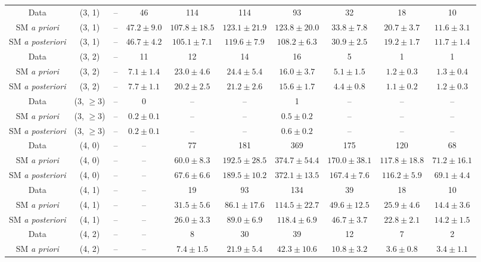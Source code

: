 \begin{table}[h!]
{\begin{tabular}{cccccccccc}
	Data & (3, 1) & -- & 46 & 114 & 114 & 93 & 32 & 18 & 10 \\[0.5ex] 
	SM \textit{a priori} & (3, 1) & -- & $47.2\pm 9.0$ & $107.8\pm 18.5$ & $123.1\pm 21.9$ & $123.8\pm 20.0$ & $33.8\pm 7.8$ & $20.7\pm 3.7$ & $11.6\pm 3.1$ \\[0.5ex] 
	SM \textit{a posteriori} & (3, 1) & -- & $46.7\pm 4.2$ & $105.1\pm 7.1$ & $119.6\pm 7.9$ & $108.2\pm 6.3$ & $30.9\pm 2.5$ & $19.2\pm 1.7$ & $11.7\pm 1.4$ \\[0.5ex] 
	Data & (3, 2) & -- & 11 & 12 & 14 & 16 & 5 & 1 & 1 \\[0.5ex] 
	SM \textit{a priori} & (3, 2) & -- & $7.1\pm 1.4$ & $23.0\pm 4.6$ & $24.4\pm 5.4$ & $16.0\pm 3.7$ & $5.1\pm 1.5$ & $1.2\pm 0.3$ & $1.3\pm 0.4$ \\[0.5ex] 
	SM \textit{a posteriori} & (3, 2) & -- & $7.7\pm 1.1$ & $20.2\pm 2.5$ & $21.2\pm 2.6$ & $15.6\pm 1.7$ & $4.4\pm 0.8$ & $1.1\pm 0.2$ & $1.2\pm 0.3$ \\[0.5ex] 
	Data & (3, $\ge3$) & -- & 0 & -- & -- & 1 & -- & -- & -- \\[0.5ex] 
	SM \textit{a priori} & (3, $\ge3$) & -- & $0.2\pm 0.1$ & -- & -- & $0.5\pm 0.2$ & -- & -- & -- \\[0.5ex] 
	SM \textit{a posteriori} & (3, $\ge3$) & -- & $0.2\pm 0.1$ & -- & -- & $0.6\pm 0.2$ & -- & -- & -- \\[0.5ex] 
	Data & (4, 0) & -- & -- & 77 & 181 & 369 & 175 & 120 & 68 \\[0.5ex] 
	SM \textit{a priori} & (4, 0) & -- & -- & $60.0\pm 8.3$ & $192.5\pm 28.5$ & $374.7\pm 54.4$ & $170.0\pm 38.1$ & $117.8\pm 18.8$ & $71.2\pm 16.1$ \\[0.5ex] 
	SM \textit{a posteriori} & (4, 0) & -- & -- & $67.6\pm 6.6$ & $189.5\pm 10.2$ & $372.1\pm 13.5$ & $167.4\pm 7.6$ & $116.2\pm 5.9$ & $69.1\pm 4.4$ \\[0.5ex] 
	Data & (4, 1) & -- & -- & 19 & 93 & 134 & 39 & 18 & 10 \\[0.5ex] 
	SM \textit{a priori} & (4, 1) & -- & -- & $31.5\pm 5.6$ & $86.1\pm 17.6$ & $114.5\pm 22.7$ & $49.6\pm 12.5$ & $25.9\pm 4.6$ & $14.4\pm 3.6$ \\[0.5ex] 
	SM \textit{a posteriori} & (4, 1) & -- & -- & $26.0\pm 3.3$ & $89.0\pm 6.9$ & $118.4\pm 6.9$ & $46.7\pm 3.7$ & $22.8\pm 2.1$ & $14.2\pm 1.5$ \\[0.5ex] 
	Data & (4, 2) & -- & -- & 8 & 30 & 39 & 12 & 7 & 2 \\[0.5ex] 
	SM \textit{a priori} & (4, 2) & -- & -- & $7.4\pm 1.5$ & $21.9\pm 5.4$ & $42.3\pm 10.6$ & $10.8\pm 3.2$ & $3.6\pm 0.8$ & $3.4\pm 1.1$ \\[0.5ex] 

\end{tabular}}
\end{table}
